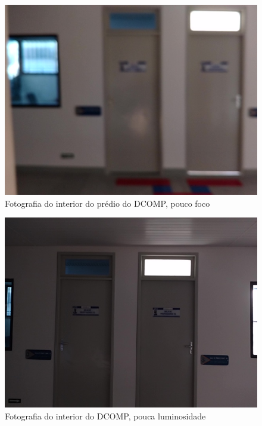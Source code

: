 \begin{figure}[!htb]
	\centering
		\includegraphics[width= \textwidth]{Imagens/figura4-17.jpg}
	\caption{Fotografia do interior do prédio do DCOMP, pouco foco}
	\label{fig4:17}
\end{figure}

\begin{figure}[!htb]
	\centering
		\includegraphics[width= \textwidth]{Imagens/figura4-18.jpg}
	\caption{Fotografia do interior do DCOMP, pouca luminosidade}
	\label{fig4:18}
\end{figure}